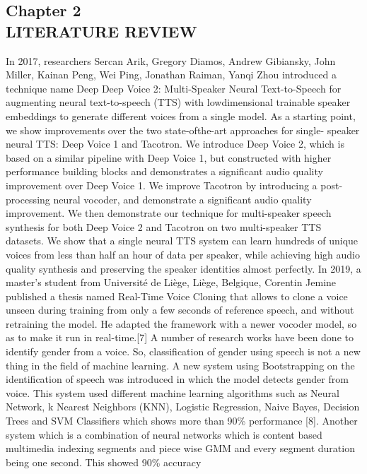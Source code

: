 \documentclass[a4paper,12pt]{article}
\begin{document}
\begin{center}
    \section*{Chapter 2 \\ LITERATURE REVIEW}
\end{center}
{In 2017, researchers Sercan Arik, Gregory Diamos, Andrew Gibiansky, John Miller, Kainan
Peng, Wei Ping, Jonathan Raiman, Yanqi Zhou introduced a technique name Deep Deep Voice
2: Multi-Speaker Neural Text-to-Speech for augmenting neural text-to-speech (TTS) with
lowdimensional trainable speaker embeddings to generate different voices from a single model.
As a starting point, we show improvements over the two state-ofthe-art approaches for single-
speaker neural TTS: Deep Voice 1 and Tacotron. We introduce Deep Voice 2, which is based
on a similar pipeline with Deep Voice 1, but constructed with higher performance building
blocks and demonstrates a significant audio quality improvement over Deep Voice 1. We
improve Tacotron by introducing a post-processing neural vocoder, and demonstrate a
significant audio quality improvement. We then demonstrate our technique for multi-speaker
speech synthesis for both Deep Voice 2 and Tacotron on two multi-speaker TTS datasets. We
show that a single neural TTS system can learn hundreds of unique voices from less than half
an hour of data per speaker, while achieving high audio quality synthesis and preserving the
speaker identities almost perfectly.
In 2019, a master’s student from Université de Liège, Liège, Belgique, Corentin Jemine
published a thesis named Real-Time Voice Cloning that allows to clone a voice unseen during
training from only a few seconds of reference speech, and without retraining the model. He
adapted the framework with a newer vocoder model, so as to make it run in real-time.[7]
A number of research works have been done to identify gender from a voice. So, classification
of gender using speech is not a new thing in the field of machine learning. A new system using
Bootstrapping on the identification of speech was introduced in which the model detects gender
from voice. This system used different machine learning algorithms such as Neural Network,
k Nearest Neighbors (KNN), Logistic Regression, Naive Bayes, Decision Trees and SVM
Classifiers which shows more than 90\% performance [8]. Another system which is a
combination of neural networks which is content based multimedia indexing segments and
piece wise GMM and every segment duration being one second. This showed 90\% accuracy
}
\end{document}
